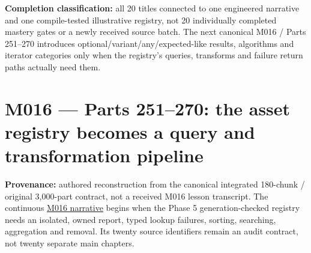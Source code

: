 \textbf{Completion classification:} all 20 titles connected to one engineered narrative and one compile-tested illustrative registry, not 20 individually completed mastery gates or a newly received source batch. The next canonical M016 / Parts 251--270 introduces optional/variant/any/expected-like results, algorithms and iterator categories only when the registry's queries, transforms and failure return paths actually need them.

\section{M016 --- Parts 251--270: the asset registry becomes a query and transformation pipeline}\label{appendix-fd090d982a15-m016-parts-251270-the-asset-registry-becomes-a-query-and-transformation-pipeline}

\textbf{Provenance:} authored reconstruction from the canonical integrated 180-chunk / original 3,000-part contract, not a received M016 lesson transcript. The continuous \href{Continuous\%20Notes/Computing\%20Foundations\%20-\%20From\%20Bits\%20to\%20C++\%20and\%20Systems\%20APIs\#From\%20a\%20living\%20asset\%20registry\%20to\%20reliable\%20queries\%20and\%20transformations}{M016 narrative} begins when the Phase 5 generation-checked registry needs an isolated, owned report, typed lookup failures, sorting, searching, aggregation and removal. Its twenty source identifiers remain an audit contract, not twenty separate main chapters.

